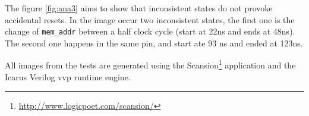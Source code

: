 The figure \ref{fig:ana3} aims to show that inconsistent states do not provoke accidental resets. In the image occur two inconsistent states, the first one is the change of \verb|mem_addr| between a half clock cycle (start at 22ns and ends at 48ns). The second one happens in the same pin, and start ate 93 ns and ended at 123ns.  

All images from the tests are generated using the Scansion\footnote{\url{http://www.logicpoet.com/scansion/}} application and the Icarus Verilog vvp runtime engine.

